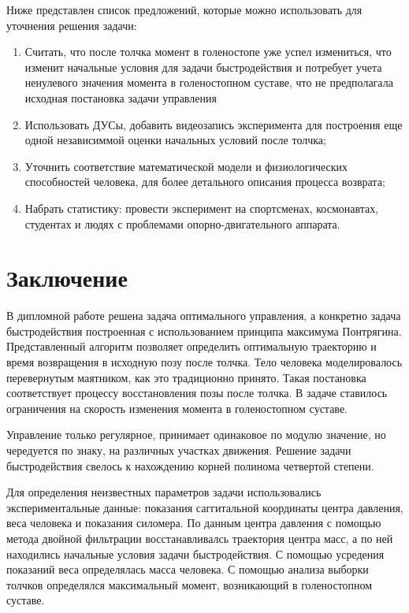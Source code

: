 \documentclass[a4paper,12pt, openany]{book}
\theoremstyle{plain} %
\theoremstyle{definition} %
\theoremstyle{remark} %
\numberwithin{equation}{chapter}
\begin{document}
{Ниже представлен список предложений, которые можно использовать для уточнения решения задачи:
\begin{enumerate}
    \item Считать, что после толчка момент в голеностопе уже успел измениться, что изменит начальные условия для задачи быстродействия 
    и потребует учета ненулевого значения момента в голеностопном суставе, что не предполагала исходная постановка задачи управления
    \item Использовать ДУСы, добавить видеозапись эксперимента для построения еще одной независиммой оценки начальных условий после толчка;
    \item Уточнить соответствие математической модели и физиологических способностей человека, для более детального описания процесса возврата;
    \item Набрать статистику: провести эксперимент на спортсменах, космонавтах, студентах и людях с проблемами опорно-двигательного аппарата.
\end{enumerate}


\newpage


\chapter*{Заключение}


В дипломной работе решена задача оптимального управления,
 а конкретно задача быстродействия построенная с использованием принципа максимума Понтрягина.
 Представленный алгоритм позволяет определить оптимальную траекторию и время возвращения в исходную позу после толчка.
Тело человека моделировалось перевернутым маятником, как это традиционно принято. Такая постановка соответствует процессу восстановления позы после толчка.
В задаче ставилось ограничения на скорость изменения момента в голеностопном суставе.

Управление только регулярное, принимает одинаковое по модулю значение, но чередуется по знаку, на различных участках движения. Решение задачи быстродействия свелось к нахождению корней полинома четвертой степени.

Для определения неизвестных параметров задачи использовались экспериментальные данные: показания саггитальной координаты центра давления, веса человека и показания силомера.
По данным центра давления с помощью метода двойной фильтрации восстанавливалсь траектория центра масс, а по ней находились начальные условия задачи быстродействия.
С помощью усредения показаний веса определялась масса человека. С помощью анализа выборки толчков определялся максимальный момент, возникающий в голеностопном суставе.

}
\end{document}
